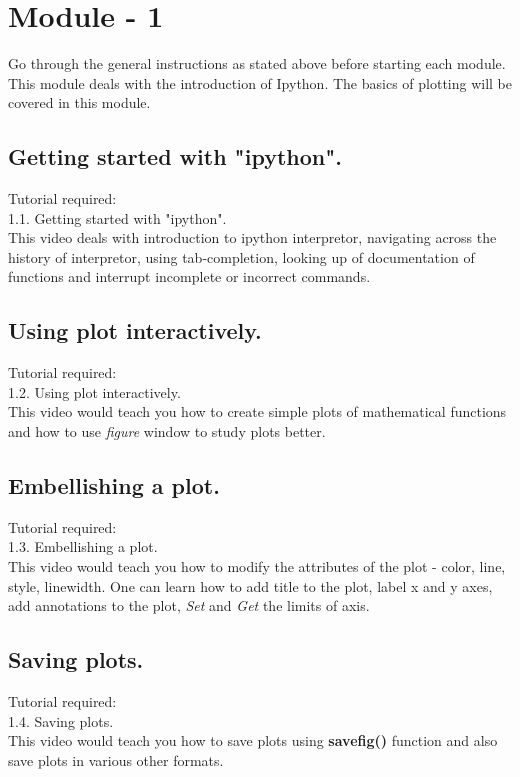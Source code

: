 \documentclass[11pt,twocolumn]{article}
\begin{document}
\section{Module - 1}
Go through the general instructions as stated above before starting each module. \\
  This module deals with the introduction of Ipython. The basics of plotting will be covered in this module.
  \subsection{Getting started with "ipython".}
    Tutorial required: \\ 1.1. Getting started with "ipython". \\ 
    This video deals with introduction to ipython interpretor, navigating across the history of interpretor, using tab-completion, looking up of documentation of functions and interrupt incomplete or incorrect commands.

 
    \subsection{Using plot interactively.}
   Tutorial required: \\ 1.2. Using plot interactively. \\
    This video would teach you how to create simple plots of mathematical functions and how to use \emph{figure} window to study plots better. 

    \subsection{Embellishing a plot.}
    Tutorial required:\\ 1.3. Embellishing a plot. \\
      This video would teach you how to modify the attributes of the plot - color, line, style, linewidth. One can learn how to add title to the plot, label x and y axes, add annotations to the plot, \emph{Set} and \emph{Get} the limits of axis.

    \subsection{Saving plots.}
    Tutorial required: \\ 1.4. Saving plots. \\
          This video would teach you how to save plots using \textbf{savefig()} function and also save plots in various other formats.
\end{document}

